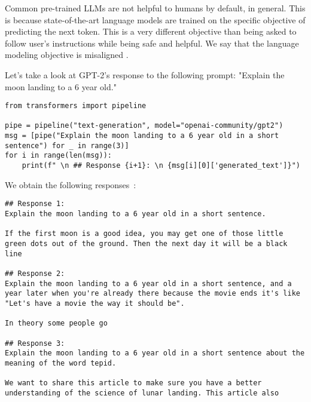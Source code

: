 Common pre-trained LLMs are not helpful to humans by default, in general. This is because state-of-the-art language models are trained on the specific objective of predicting the next token. This is a very different objective than being asked to follow user's instructions while being safe and helpful. We say that the language modeling objective is misaligned \cite{ouyang2022traininglanguagemodelsfollow}.

Let's take a look at GPT-2's response to the following prompt: "Explain the moon landing to a 6 year old."

\begin{verbatim}
from transformers import pipeline

pipe = pipeline("text-generation", model="openai-community/gpt2")
msg = [pipe("Explain the moon landing to a 6 year old in a short sentence") for _ in range(3)]
for i in range(len(msg)):
    print(f" \n ## Response {i+1}: \n {msg[i][0]['generated_text']}")
\end{verbatim}

We obtain the following responses~:

\begin{verbatim}
## Response 1: 
Explain the moon landing to a 6 year old in a short sentence.
    
If the first moon is a good idea, you may get one of those little green dots out of the ground. Then the next day it will be a black line
     
## Response 2: 
Explain the moon landing to a 6 year old in a short sentence, and a year later when you're already there because the movie ends it's like "Let's have a movie the way it should be".
    
In theory some people go
     
## Response 3: 
Explain the moon landing to a 6 year old in a short sentence about the meaning of the word tepid.
    
We want to share this article to make sure you have a better understanding of the science of lunar landing. This article also
\end{verbatim}

